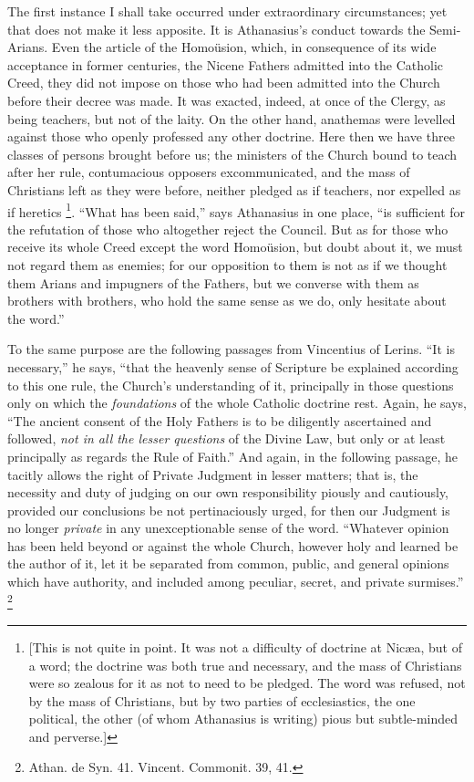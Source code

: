 The first instance I shall take occurred under extraordinary
circumstances; yet that does not make it less apposite. It is
Athanasius's conduct towards the Semi-Arians. Even the article of the
Homoüsion, which, in consequence of its wide acceptance in former
centuries, the Nicene Fathers admitted into the Catholic Creed, they
did not impose on those who had been admitted into the Church before
their decree was made. It was exacted, indeed, at once of the Clergy,
as being teachers, but not of the laity. On the other hand, anathemas
were levelled against those who openly professed any other doctrine.
Here then we have three classes of persons brought before us; the
ministers of the Church bound to teach after her rule,
contumacious opposers excommunicated, and the mass of Christians left
as they were before, neither pledged as if teachers, nor expelled as
if heretics \footnote{[This is not quite in point. It was not a
difficulty of doctrine at Nicæa, but of a word; the doctrine was both
true and necessary, and the mass of Christians were so zealous for it
as not to need to be pledged. The word was refused, not by the mass of
Christians, but by two parties of ecclesiastics, the one political,
the other (of whom Athanasius is writing) pious but subtle-minded and
perverse.]}. ``What
has been said,'' says Athanasius in one place, ``is sufficient
for the refutation of those who altogether reject the Council. But as
for those who receive its whole Creed except the word Homoüsion, but
doubt about it, we must not regard them as enemies; for our opposition
to them is not as if we thought them Arians and impugners of the
Fathers, but we converse with them as brothers with brothers, who hold
the same sense as we do, only hesitate about the word.''

To the same purpose are the following passages from Vincentius of
Lerins. ``It is necessary,'' he says, ``that the heavenly
sense of Scripture be explained according to this one rule, the Church's
understanding of it, principally in those questions only on which the \emph{foundations}
of the whole Catholic doctrine rest. Again, he says, ``The ancient
consent of the Holy Fathers is to be diligently ascertained and
followed, \emph{not in all the lesser questions} of the Divine Law,
but only or at least principally as regards the Rule of Faith.''
And again, in the following passage, he tacitly allows the right of
Private Judgment in lesser matters; that is, the necessity and duty of
judging on our own responsibility piously and cautiously, provided our
conclusions be not pertinaciously urged, for then our Judgment is no
longer \emph{private} in any unexceptionable sense of the word.
``Whatever opinion has been held beyond or against the whole
Church, however holy and learned be the author of it, let it be
separated from common, public, and general opinions which have
authority, and included among peculiar, secret, and private
surmises.'' \footnote{Athan. de Syn. 41. Vincent. Commonit. 39,
41.}

